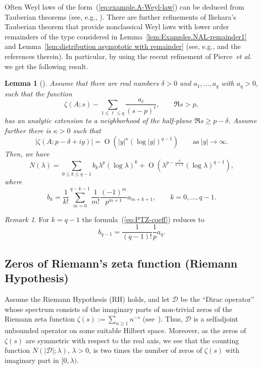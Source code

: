 \documentclass[10pt, a4paper]{amsart}
\newcommand{\sD}{\mathscr{D}}
\newcommand{\op}{\operatorname}
\numberwithin{equation}{section}
\newtheorem{lemma}[theorem]{Lemma}
\theoremstyle{definition}
\theoremstyle{remark}
\newtheorem{remark}[theorem]{Remark}
\begin{document}
Often Weyl laws of the form~(\ref{eq:example.A-Weyl-law}) can be deduced from Tauberian theorems (see, e.g., \cite{Ar:HMJ83,  De:ASENS54, Ko:Springer04}). There are further refinements of Ikehara's Tauberian theorem that provide nonclassical Weyl laws with lower order remainders of the type considered in Lemma~\ref{lem:Examples.NAL-remainder1} and Lemma~\ref{lem:distribution asymptotic with remainder} (see, e.g., \cite{Ar:AMH96, PTZ:arXiv25} and the references therein).  In particular, by using the recent refinement of Pierce~\emph{et al.}~\cite[Theorem~B]{PTZ:arXiv25} we get the following result. 

\begin{lemma}[\cite{PTZ:arXiv25}]\label{lem:PTZ}
Assume that there are real numbers $\delta>0$ and $a_1, \ldots, a_q$ with $a_q>0$, such that the function
\begin{equation*}
 \zeta(A;s) - \sum_{1\leq \ell \leq q} \frac{a_\ell}{(s-p)^{\ell}}, \qquad \Re s>p, 
\end{equation*}
has an analytic extension to a neighborhood of the half-plane $\Re s\geq p-\delta$. Assume further there is $\kappa>0$ such that 
\begin{equation*}
\left|\zeta(A;p-\delta+iy)\right| = \op{O}\left(|y|^\kappa \left(\log |y|\right)^{q-1}\right)\qquad \text{as}\ |y|\rightarrow \infty. 
\end{equation*}
	Then, we have 
\begin{equation*}
 N(\lambda) = \sum_{0\leq k \leq q-1} b_k \lambda^p (\log \lambda)^{k} + \op{O}\left(\lambda^{p-\frac{\delta}{\kappa+1}}(\log \lambda)^{q-1}\right), 
\end{equation*}
where 
\begin{equation}\label{eq:PTZ-coeff}
 b_k = \frac{1}{k!} \sum_{m=0}^{q-k-1} \frac{1}{m!}\frac{(-1)^m}{p^{m+1}} a_{m+k+1}, \qquad k=0, \ldots, q-1. 
\end{equation}
\end{lemma}

\begin{remark}
 For $k=q-1$ the formula~(\ref{eq:PTZ-coeff}) reduces to 
 \begin{equation*}
 b_{q-1}= \frac{1}{(q-1)!}  \frac{1}{p}a_q. 
\end{equation*}
\end{remark}



\subsection{Zeros of Riemann's zeta function (Riemann Hypothesis)}
Assume the Riemann Hypothesis (RH) holds, and let $\sD$ be the ``Dirac operator'' whose spectrum consists of the imaginary parts of non-trivial zeros of the Riemann zeta function  $\zeta(s):=\sum_{n\geq 1} n^{-s}$ (see~\cite{Co:AFA24, CM:PNAS22}). Thus, $\sD$ is a selfadjoint unbounded operator on some suitable Hilbert space. Moreover, as the zeros of $\zeta(s)$ are symmetric with respect to the real axis, we see that the counting function $N(|\sD|;\lambda)$, $\lambda>0$, is two times the number of zeros of
$\zeta(s)$ with imaginary part in $[0,\lambda)$. 
\end{document}
